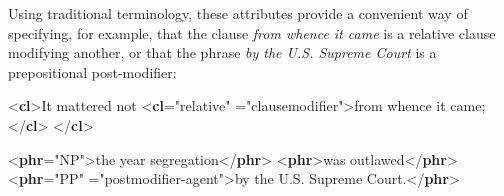 Using traditional terminology, these attributes provide a convenient way of specifying, for example, that the clause \textit{from whence it came} is a relative clause modifying another, or that the phrase \textit{by the U.S. Supreme Court} is a prepositional post-modifier: \par\bgroup{}\exampleFont \begin{shaded}\noindent\mbox{}{<\textbf{cl}>}It mattered not\mbox{}\newline 
{<\textbf{cl}\hspace*{1em}{type}="{relative}"\mbox{}\newline 
\hspace*{1em}\hspace*{1em}{function}="{clause\textunderscore modifier}">}from whence it came;{</\textbf{cl}>}\mbox{}\newline 
{</\textbf{cl}>}\end{shaded}\egroup\par \noindent  \par\bgroup{}\exampleFont \begin{shaded}\noindent\mbox{}{<\textbf{phr}\hspace*{1em}{type}="{NP}">}the year segregation{</\textbf{phr}>}\mbox{}\newline 
{<\textbf{phr}>}was outlawed{</\textbf{phr}>}\mbox{}\newline 
{<\textbf{phr}\hspace*{1em}{type}="{PP}"\mbox{}\newline 
\hspace*{1em}{function}="{postmodifier-agent}">}by the U.S. Supreme Court.{</\textbf{phr}>}\end{shaded}\egroup\par \par
